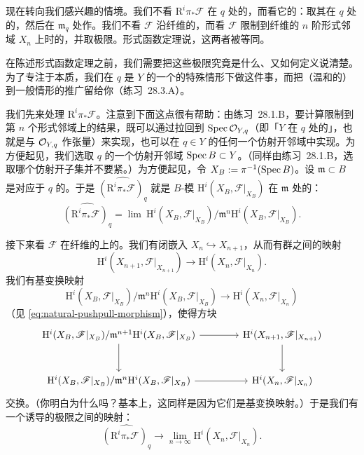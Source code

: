 现在转向我们感兴趣的情境。我们不看 $\mathrm{R}^i\pi_*\mathscr{F}$ 在 $q$ 处的\trFiber，而看它的\trCompletion：取其在 $q$ 处的\trStalk，然后在\trMaximalIdeal{} $\mathfrak{m}_q$ 处作\trCompletion。我们不看 $\mathscr{F}$ 沿纤维的\trCohomology，而看 $\mathscr{F}$ 限制到纤维的 $n$ 阶形式邻域 $X_n$ 上时的\trCohomology，并取极限。形式函数定理说，这两者被\trCanonically{}等同。

在陈述形式函数定理之前，我们需要把这些极限究竟是什么、又如何定义说清楚。为了专注于本质，我们在 $q$ 是 $Y$ 的一个\emph{\trClosedPoint}的特殊情形下做这件事，而把（温和的）到一般情形的推广留给你（\mbox{练习~28.3.A}）。

我们先来处理 $\mathrm{R}^i\pi_*\mathscr{F}$。注意到下面这点很有帮助：由\mbox{练习~28.1.B}，要计算限制到第 $n$ 个形式邻域上的结果，既可以通过拉回到 $\operatorname{Spec}\mathcal{O}_{Y,q}$（即「$Y$ 在 $q$ 处的\trGerm」，也就是与 $\mathcal{O}_{Y,q}$ 作张量）来实现，也可以在 $q\in Y$ 的任何一个仿射开邻域中实现。为方便起见，我们选取 $q$ 的一个仿射开邻域 $\operatorname{Spec} B\subset Y$。（同样由\mbox{练习~28.1.B}，选取哪个仿射开子集并不要紧。）为方便起见，令 $X_B:=\pi^{-1}(\operatorname{Spec} B)$。设 $\mathfrak{m}\subset B$ 是对应于 $q$ 的\trMaximalIdeal。于是 $\widehat{(\mathrm{R}^i\pi_*\mathscr{F})_q}$ \trCanonically{}就是\trCoh{} $B$-模 $\mathrm{H}^i(X_B,\mathscr{F}|_{X_B})$ 在 $\mathfrak{m}$ 处的\trCompletion：
\[
\widehat{(\mathrm{R}^i\pi_*\mathscr{F})_q}
=\lim\ \mathrm{H}^i(X_B,\mathscr{F}|_{X_B})/\mathfrak{m}^n\mathrm{H}^i(X_B,\mathscr{F}|_{X_B}).
\]

接下来看 $\mathscr{F}$ 在纤维的\trThickening{}上的\trCohomology。我们有闭嵌入 $X_n\hookrightarrow X_{n+1}$，从而有\trCohomology{}群之间的映射
\[
\mathrm{H}^i(X_{n+1},\mathscr{F}|_{X_{n+1}})
\longrightarrow
\mathrm{H}^i(X_n,\mathscr{F}|_{X_n}).
\]
我们有基变换映射
\begin{equation*}
\tag{28.3.1.1}\label{eq:base-change-map-finite-level}
\mathrm{H}^i(X_B,\mathscr{F}|_{X_B})/\mathfrak{m}^n\mathrm{H}^i(X_B,\mathscr{F}|_{X_B})
\longrightarrow
\mathrm{H}^i(X_n,\mathscr{F}|_{X_n})
\end{equation*}
（见 \eqref{eq:natural-pushpull-morphism}），使得方块
\[
\begin{tikzcd}[row sep=2.8em, column sep=4em]
\mathrm{H}^i(X_B,\mathscr{F}|_{X_B})/\mathfrak{m}^{n+1}\mathrm{H}^i(X_B,\mathscr{F}|_{X_B})
\ar[r]\ar[d] &
\mathrm{H}^i(X_{n+1},\mathscr{F}|_{X_{n+1}})
\ar[d] \\
\mathrm{H}^i(X_B,\mathscr{F}|_{X_B})/\mathfrak{m}^n\mathrm{H}^i(X_B,\mathscr{F}|_{X_B})
\ar[r] &
\mathrm{H}^i(X_n,\mathscr{F}|_{X_n})
\end{tikzcd}
\]
交换。（你明白为什么吗？基本上，这同样是因为它们是基变换映射。）于是我们有一个诱导的极限之间的映射：
\begin{equation*}
\tag{28.3.1.2}\label{eq:limit-map}
\widehat{(\mathrm{R}^i\pi_*\mathscr{F})_q}
\longrightarrow
\lim_{n\to\infty}\mathrm{H}^i(X_n,\mathscr{F}|_{X_n}).
\end{equation*}

